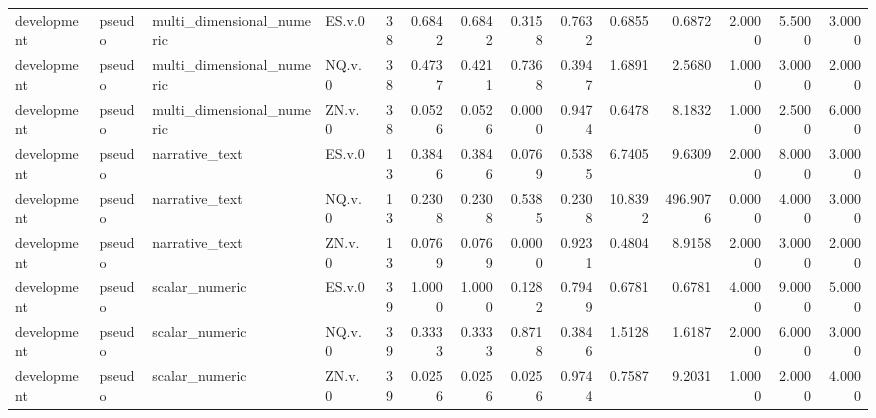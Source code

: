 \begin{tabular}{llllrrrrrrrrrr}
development & pseudo & multi_dimensional_numeric & ES.v.0 & 38 & 0.6842 & 0.6842 & 0.3158 & 0.7632 & 0.6855 & 0.6872 & 2.0000 & 5.5000 & 3.0000 \\
development & pseudo & multi_dimensional_numeric & NQ.v.0 & 38 & 0.4737 & 0.4211 & 0.7368 & 0.3947 & 1.6891 & 2.5680 & 1.0000 & 3.0000 & 2.0000 \\
development & pseudo & multi_dimensional_numeric & ZN.v.0 & 38 & 0.0526 & 0.0526 & 0.0000 & 0.9474 & 0.6478 & 8.1832 & 1.0000 & 2.5000 & 6.0000 \\
development & pseudo & narrative_text & ES.v.0 & 13 & 0.3846 & 0.3846 & 0.0769 & 0.5385 & 6.7405 & 9.6309 & 2.0000 & 8.0000 & 3.0000 \\
development & pseudo & narrative_text & NQ.v.0 & 13 & 0.2308 & 0.2308 & 0.5385 & 0.2308 & 10.8392 & 496.9076 & 0.0000 & 4.0000 & 3.0000 \\
development & pseudo & narrative_text & ZN.v.0 & 13 & 0.0769 & 0.0769 & 0.0000 & 0.9231 & 0.4804 & 8.9158 & 2.0000 & 3.0000 & 2.0000 \\
development & pseudo & scalar_numeric & ES.v.0 & 39 & 1.0000 & 1.0000 & 0.1282 & 0.7949 & 0.6781 & 0.6781 & 4.0000 & 9.0000 & 5.0000 \\
development & pseudo & scalar_numeric & NQ.v.0 & 39 & 0.3333 & 0.3333 & 0.8718 & 0.3846 & 1.5128 & 1.6187 & 2.0000 & 6.0000 & 3.0000 \\
development & pseudo & scalar_numeric & ZN.v.0 & 39 & 0.0256 & 0.0256 & 0.0256 & 0.9744 & 0.7587 & 9.2031 & 1.0000 & 2.0000 & 4.0000 \\
\bottomrule
\end{tabular}
